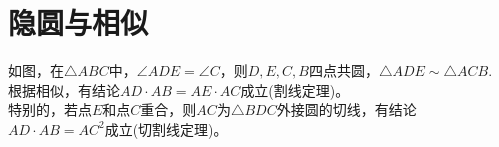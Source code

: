\documentclass{ecnuthesis}
\begin{document}
\section{隐圆与相似}
\begin{model}
    如图，在$\triangle ABC$中，$\angle ADE=\angle C$，则$D,E,C,B$四点共圆，$\triangle ADE \sim \triangle ACB.$ \\
    根据相似，有结论$AD·AB=AE·AC$成立(割线定理)。 \\
    特别的，若点$E$和点$C$重合，则$AC$为$\triangle BDC$外接圆的切线，有结论$AD·AB=AC^2$成立(切割线定理)。 \\
\end{model}
\end{document}

